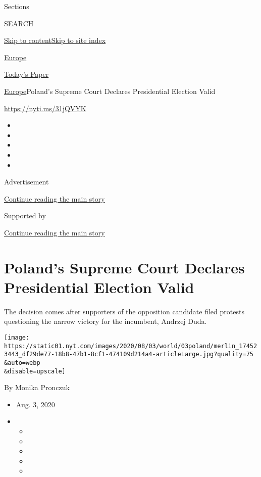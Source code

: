 Sections

SEARCH

\protect\hyperlink{site-content}{Skip to
content}\protect\hyperlink{site-index}{Skip to site index}

\href{https://www.nytimes.com/section/world/europe}{Europe}

\href{https://myaccount.nytimes.com/auth/login?response_type=cookie\&client_id=vi}{}

\href{https://www.nytimes.com/section/todayspaper}{Today's Paper}

\href{/section/world/europe}{Europe}\textbar{}Poland's Supreme Court
Declares Presidential Election Valid

\url{https://nyti.ms/31jQVYK}

\begin{itemize}
\item
\item
\item
\item
\item
\end{itemize}

Advertisement

\protect\hyperlink{after-top}{Continue reading the main story}

Supported by

\protect\hyperlink{after-sponsor}{Continue reading the main story}

\hypertarget{polands-supreme-court-declares-presidential-election-valid}{%
\section{Poland's Supreme Court Declares Presidential Election
Valid}\label{polands-supreme-court-declares-presidential-election-valid}}

The decision comes after supporters of the opposition candidate filed
protests questioning the narrow victory for the incumbent, Andrzej Duda.

\texttt{[image: https://static01.nyt.com/images/2020/08/03/world/03poland/merlin\_174523443\_df29de77-18b8-47b1-8cf1-474109d214a4-articleLarge.jpg?quality=75\\\&auto=webp\\\&disable=upscale]}

By Monika Pronczuk

\begin{itemize}
\item
  Aug. 3, 2020
\item
  \begin{itemize}
  \item
  \item
  \item
  \item
  \item
  \end{itemize}
\end{itemize}

